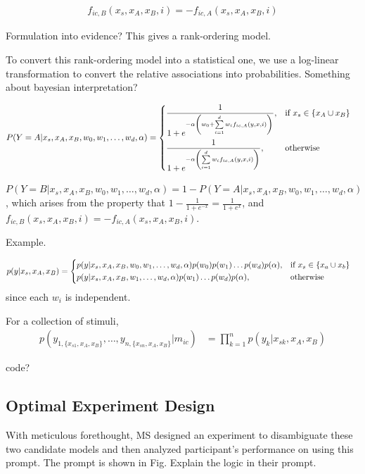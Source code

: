 \documentclass{article}
\begin{document}
\begin{align}
f_{ic,B}(x_s, x_A, x_B, i) = -f_{ic,A}(x_s, x_A, x_B, i)
\end{align}

Formulation into evidence? This gives a rank-ordering model.

To convert this rank-ordering model into a statistical one, we use a log-linear transformation to convert the relative associations into probabilities. Something about bayesian interpretation?

\begin{align}
    P(Y=A| x_s, x_A, x_B, w_0, w_1, \dots, w_d, \alpha) &= 
        \begin{dcases}
            \frac{1}{1 + e^{-\alpha \left(w_0 + \sum \limits_{i=1}^d w_i f_{ic,A}(y, x, i)\right)}}, & \text{if } x_s \in \{x_A \cup x_B\}\\
            \frac{1}{1 + e^{-\alpha \left(\sum \limits_{i=1}^d w_i f_{ic,A}(y, x, i)\right)}}, & \text{otherwise }
        \end{dcases}
\end{align}

$P(Y=B| x_s, x_A, x_B, w_0, w_1, \dots, w_d, \alpha) = 1- P(Y=A| x_s, x_A, x_B, w_0, w_1, \dots, w_d, \alpha)$, which arises from the property that $1-\frac{1}{1+e^{-x}} = \frac{1}{1+e^x}$, and $f_{ic,B}(x_s, x_A, x_B, i) = -f_{ic,A}(x_s, x_A, x_B, i)$.

Example.

\begin{align}
    p(y | x_s, x_A, x_B) &=  
        \begin{dcases}
            p(y|x_s, x_A, x_B, w_0, w_1, \dots, w_d, \alpha) p(w_0) p(w_1) \dots p(w_d) p(\alpha), & \text{if } x_s \in \{x_a \cup x_b\}\\
            p(y|x_s, x_A, x_B, w_1, \dots, w_d, \alpha) p(w_1) \dots p(w_d) p(\alpha), & \text{otherwise}
        \end{dcases}
\end{align}
since each $w_i$ is independent.

For a collection of stimuli, 
\begin{align}
    p(y_{1,\{x_{s1}, x_A, x_B\}}, \dots, y_{n,\{x_{sn}, x_A, x_B\}} | m_{ic}) &=  \prod\limits_{k=1}^n p(y_k|x_{sk}, x_A, x_B) 
\end{align}

code?

\subsection{Optimal Experiment Design}
With meticulous forethought, MS designed an experiment to disambiguate these two candidate models and then analyzed participant's performance on using this prompt. The prompt is shown in Fig. Explain the logic in their prompt.
\end{document}
